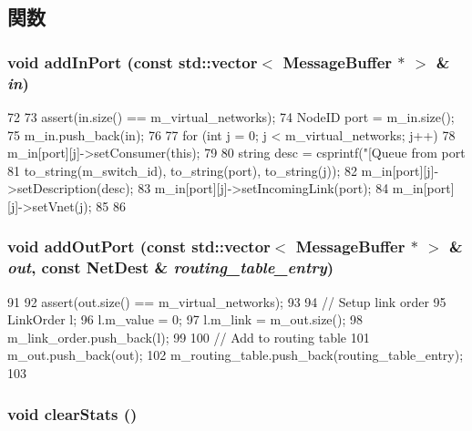 \subsection{関数}
\hypertarget{classPerfectSwitch_a1c4c43d5cc554f870b4c7a485fb25c7e}{
\subsubsection[{addInPort}]{\setlength{\rightskip}{0pt plus 5cm}void addInPort (const {\bf std::vector}$<$ {\bf MessageBuffer} $\ast$ $>$ \& {\em in})}}
\label{classPerfectSwitch_a1c4c43d5cc554f870b4c7a485fb25c7e}



\begin{DoxyCode}
72 {
73     assert(in.size() == m_virtual_networks);
74     NodeID port = m_in.size();
75     m_in.push_back(in);
76 
77     for (int j = 0; j < m_virtual_networks; j++) {
78         m_in[port][j]->setConsumer(this);
79 
80         string desc = csprintf("[Queue from port %
81             to_string(m_switch_id), to_string(port), to_string(j));
82         m_in[port][j]->setDescription(desc);
83         m_in[port][j]->setIncomingLink(port);
84         m_in[port][j]->setVnet(j);
85     }
86 }
\end{DoxyCode}
\hypertarget{classPerfectSwitch_a79640b497a553306c19f2458ce05d4be}{
\subsubsection[{addOutPort}]{\setlength{\rightskip}{0pt plus 5cm}void addOutPort (const {\bf std::vector}$<$ {\bf MessageBuffer} $\ast$ $>$ \& {\em out}, \/  const {\bf NetDest} \& {\em routing\_\-table\_\-entry})}}
\label{classPerfectSwitch_a79640b497a553306c19f2458ce05d4be}



\begin{DoxyCode}
91 {
92     assert(out.size() == m_virtual_networks);
93 
94     // Setup link order
95     LinkOrder l;
96     l.m_value = 0;
97     l.m_link = m_out.size();
98     m_link_order.push_back(l);
99 
100     // Add to routing table
101     m_out.push_back(out);
102     m_routing_table.push_back(routing_table_entry);
103 }
\end{DoxyCode}
\hypertarget{classPerfectSwitch_ac7ec7476159db4e2bb0372e30010fc9e}{
\subsubsection[{clearStats}]{\setlength{\rightskip}{0pt plus 5cm}void clearStats ()}}
\label{classPerfectSwitch_ac7ec7476159db4e2bb0372e30010fc9e}




